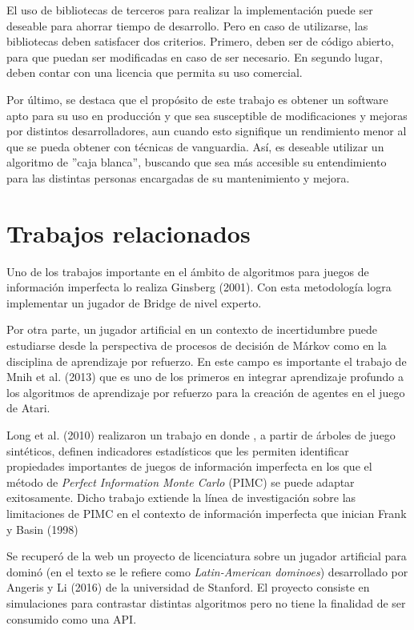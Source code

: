 El uso de bibliotecas de terceros para realizar la implementación puede ser
deseable para ahorrar tiempo de desarrollo. Pero en caso de utilizarse, las
bibliotecas deben satisfacer dos criterios. Primero, deben ser de código
abierto, para que puedan ser modificadas en caso de ser necesario. En segundo
lugar, deben contar con una licencia que permita su uso comercial.

Por último, se destaca que el propósito de este trabajo es obtener un software
apto para su uso en producción y que sea susceptible de modificaciones y mejoras
por distintos desarrolladores, aun cuando esto signifique un rendimiento menor
al que se pueda obtener con técnicas de vanguardia. Así, es deseable utilizar un
algoritmo de ''caja blanca'', buscando que sea más accesible su entendimiento
para las distintas personas encargadas de su mantenimiento y mejora.


\section{Trabajos relacionados}

Uno de los trabajos importante en el ámbito de algoritmos  para juegos de
información imperfecta lo realiza Ginsberg  (2001).  Con esta metodología logra
implementar un jugador de Bridge de nivel experto.

Por otra parte, un jugador artificial en un contexto de incertidumbre puede
estudiarse desde la perspectiva de procesos de decisión de Márkov como en la
disciplina de aprendizaje por refuerzo. En este campo es importante el trabajo
de Mnih et al. (2013) que es uno de los primeros en integrar aprendizaje
profundo a los algoritmos de aprendizaje por refuerzo para la creación de
agentes en el juego de Atari.

Long et al. (2010) realizaron un trabajo en donde , a partir de árboles de juego
sintéticos, definen indicadores estadísticos que les permiten identificar
propiedades importantes de juegos de información imperfecta en los que el método
de \textit{Perfect Information Monte Carlo} (PIMC)  se puede adaptar
exitosamente. Dicho trabajo extiende la línea de investigación sobre las
limitaciones de PIMC en el contexto de información imperfecta que inician Frank
y Basin (1998)

Se recuperó de la web un proyecto de licenciatura sobre un jugador
artificial para dominó (en el texto se le refiere como \textit{Latin-American
dominoes}) desarrollado por Angeris y Li (2016) de la universidad de Stanford.
El proyecto consiste en simulaciones para contrastar distintas algoritmos pero
no tiene la finalidad de ser consumido como una API.

